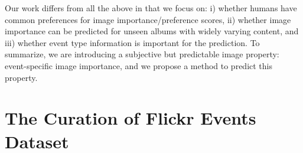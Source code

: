 \documentclass[10pt,twocolumn,letterpaper]{article}
\begin{document}

Our work differs from all the above in that we focus on: i) whether humans have common preferences for image importance/preference scores, ii) whether image importance can be predicted for unseen albums with widely varying content, and iii) whether event type information is important for the prediction. To summarize, we are introducing a subjective but predictable image property: event-specific image importance, and we propose a method to predict this property.
\section{The  Curation of Flickr Events Dataset}
\end{document}
